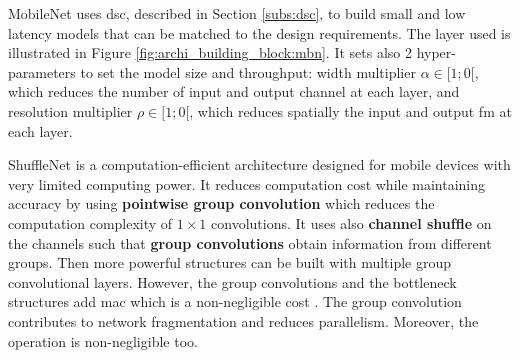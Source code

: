 MobileNet \cite{howard_mobilenets_2017} uses \acrshort{dsc}, described in Section \ref{subs:dsc}, to build small and low latency models that can be matched to the design requirements. The layer used is illustrated in Figure \ref{fig:archi_building_block:mbn}. It sets also 2 hyper-parameters to set the model size and throughput: width multiplier $\alpha \in [1; 0[$, which reduces the number of input and output channel at each layer, and resolution multiplier $\rho \in [1; 0[$,  which reduces spatially the input and output \acrshort{fm} at each layer.

ShuffleNet \cite{zhang_shufflenet_2018} is a computation-efficient architecture designed for mobile devices with very limited computing power. It reduces computation cost while maintaining accuracy by using \textbf{pointwise group convolution} which reduces the computation complexity of $1 \times 1$ convolutions. It uses also \textbf{channel shufﬂe} on the channels such that \textbf{group convolutions} obtain information from different groups. Then more powerful structures can be built with multiple group convolutional layers. However, the group convolutions and the bottleneck structures add \acrshort{mac} which is a non-negligible cost \cite{ma_shufflenet_2018}. The group convolution contributes to network fragmentation and reduces parallelism. Moreover, the  operation is non-negligible too.

